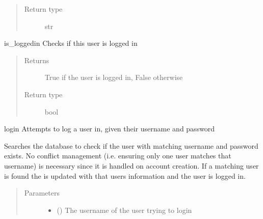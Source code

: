 \documentclass[letterpaper,10pt,english]{sphinxmanual}
\begin{document}
\begin{fulllineitems}
\begin{fulllineitems}
\begin{quote}
\begin{description}
\item[{Return type}] \leavevmode
str

\end{description}\end{quote}

\end{fulllineitems}


\begin{fulllineitems}
\label{\detokenize{flaskapp.data:flaskapp.data.user.User.is_loggedin}}
is\_loggedin Checks if this user is logged in
\begin{quote}\begin{description}
\item[{Returns}] \leavevmode
True if the user is logged in, False otherwise

\item[{Return type}] \leavevmode
bool

\end{description}\end{quote}

\end{fulllineitems}


\begin{fulllineitems}
\label{\detokenize{flaskapp.data:flaskapp.data.user.User.login}}
login Attempts to log a user in, given their username and password

Searches the database to check if the user with matching username and
password exists. No conflict management (i.e. ensuring only one user
matches that username) is necessary since it is handled on account
creation. If a matching user is found the  is updated
with that users information and the user is logged in.
\begin{quote}\begin{description}
\item[{Parameters}] \leavevmode\begin{itemize}
\item {} 
 () \textendash{} The username of the user trying to login


\end{itemize}
\end{description}
\end{quote}
\end{fulllineitems}
\end{fulllineitems}
\end{document}
